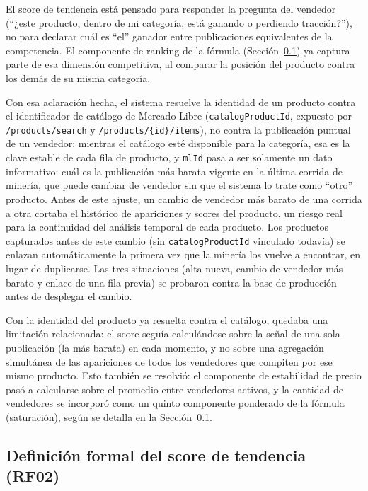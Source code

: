 El score de tendencia está pensado para responder la pregunta del vendedor (``¿este producto, dentro de mi categoría, está ganando o perdiendo tracción?''), no para declarar cuál es ``el'' ganador entre publicaciones equivalentes de la competencia. El componente de ranking de la fórmula (Sección~\ref{sec:score-formal}) ya captura parte de esa dimensión competitiva, al comparar la posición del producto contra los demás de su misma categoría.

Con esa aclaración hecha, el sistema resuelve la identidad de un producto contra el identificador de catálogo de Mercado Libre (\texttt{catalogProductId}, expuesto por \texttt{/products/search} y \texttt{/products/\{id\}/items}), no contra la publicación puntual de un vendedor: mientras el catálogo esté disponible para la categoría, esa es la clave estable de cada fila de producto, y \texttt{mlId} pasa a ser solamente un dato informativo: cuál es la publicación más barata vigente en la última corrida de minería, que puede cambiar de vendedor sin que el sistema lo trate como ``otro'' producto. Antes de este ajuste, un cambio de vendedor más barato de una corrida a otra cortaba el histórico de apariciones y scores del producto, un riesgo real para la continuidad del análisis temporal de cada producto. Los productos capturados antes de este cambio (sin \texttt{catalogProductId} vinculado todavía) se enlazan automáticamente la primera vez que la minería los vuelve a encontrar, en lugar de duplicarse. Las tres situaciones (alta nueva, cambio de vendedor más barato y enlace de una fila previa) se probaron contra la base de producción antes de desplegar el cambio.

Con la identidad del producto ya resuelta contra el catálogo, quedaba una limitación relacionada: el score seguía calculándose sobre la señal de una sola publicación (la más barata) en cada momento, y no sobre una agregación simultánea de las apariciones de todos los vendedores que compiten por ese mismo producto. Esto también se resolvió: el componente de estabilidad de precio pasó a calcularse sobre el promedio entre vendedores activos, y la cantidad de vendedores se incorporó como un quinto componente ponderado de la fórmula (saturación), según se detalla en la Sección~\ref{sec:score-formal}.

\subsection{Definición formal del score de tendencia (RF02)}\label{sec:score-formal}

